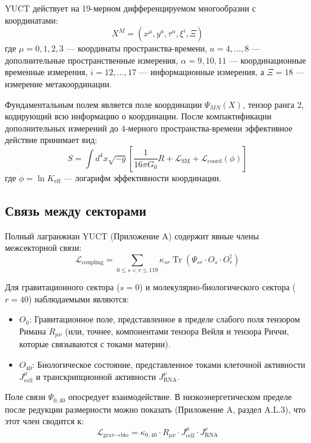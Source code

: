 \documentclass[12pt,a4paper]{article}
\theoremstyle{remark}
\newcommand{\Keff}{K_{\mathrm{eff}}}
\begin{document}
	YUCT действует на 19-мерном дифференцируемом многообразии с координатами:
	\[
	X^M = (x^\mu, y^a, \tau^\alpha, \xi^i, \Xi)
	\]
	где \(\mu = 0,1,2,3\) — координаты пространства-времени, \(a = 4,\dots,8\) — дополнительные пространственные измерения, \(\alpha = 9,10,11\) — координационные временные измерения, \(i = 12,\dots,17\) — информационные измерения, а \(\Xi = 18\) — измерение метакоординации.
	
	Фундаментальным полем является поле координации \(\Psi_{MN}(X)\), тензор ранга 2, кодирующий всю информацию о координации. После компактификации дополнительных измерений до 4-мерного пространства-времени эффективное действие принимает вид:
	\begin{equation}
		S = \int d^4x \sqrt{-g} \left[ \frac{1}{16\pi G_0} R + \mathcal{L}_{\text{SM}} + \mathcal{L}_{\text{coord}}(\phi) \right]
		\label{eq:action}
	\end{equation}
	где \(\phi = \ln \Keff\) — логарифм эффективности координации.
	
	\subsection{Связь между секторами}
	
	Полный лагранжиан YUCT (Приложение A) содержит явные члены межсекторной связи:
	\begin{equation}
		\mathcal{L}_{\text{coupling}} = \sum_{0 \le s < r \le 119} \kappa_{sr} \operatorname{Tr}(\Psi_{sr} \cdot O_s \cdot O_r^\dagger)
		\label{eq:full-coupling}
	\end{equation}
	
	Для гравитационного сектора (\(s=0\)) и молекулярно-биологического сектора (\(r=40\)) наблюдаемыми являются:
	\begin{itemize}
		\item \(O_0\): Гравитационное поле, представленное в пределе слабого поля тензором Римана \(R_{\mu\nu}\) (или, точнее, компонентами тензора Вейля и тензора Риччи, которые связываются с токами материи).
		\item \(O_{40}\): Биологическое состояние, представленное токами клеточной активности \(J_{\text{cell}}^\mu\) и транскрипционной активности \(J_{\text{RNA}}^\nu\).
	\end{itemize}
	
	Поле связи \(\Psi_{0,40}\) опосредует взаимодействие. В низкоэнергетическом пределе после редукции размерности можно показать (Приложение A, раздел A.L.3), что этот член сводится к:
	\begin{equation}
		\mathcal{L}_{\text{grav}\to\text{bio}} = \kappa_{0,40} \cdot R_{\mu\nu} \cdot J_{\text{cell}}^\mu \cdot J_{\text{RNA}}^\nu
		\label{eq:coupling-raw}
	\end{equation}
	
\end{document}
